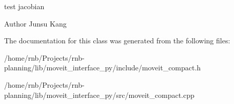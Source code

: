 test jacobian 

\begin{DoxyAuthor}{Author}
Junsu Kang 
\end{DoxyAuthor}


The documentation for this class was generated from the following files\+:\begin{DoxyCompactItemize}
\item 
/home/rnb/\+Projects/rnb-\/planning/lib/moveit\+\_\+interface\+\_\+py/include/moveit\+\_\+compact.\+h\item 
/home/rnb/\+Projects/rnb-\/planning/lib/moveit\+\_\+interface\+\_\+py/src/moveit\+\_\+compact.\+cpp\end{DoxyCompactItemize}
